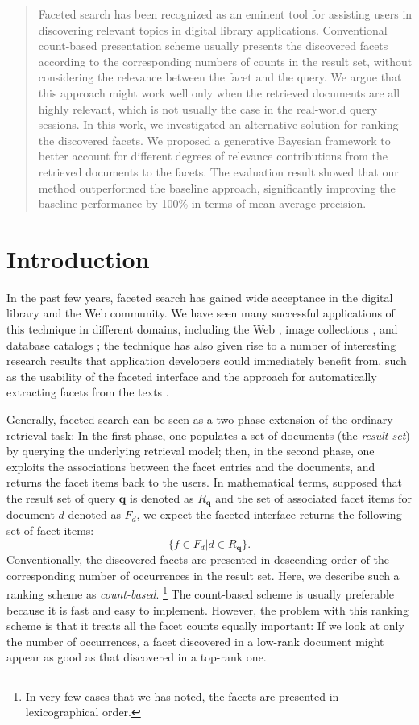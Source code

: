 \begin{abstract} Faceted search has been recognized as an eminent tool for
assisting users in discovering relevant topics in digital library applications.
Conventional count-based presentation scheme usually presents the discovered
facets according to the corresponding numbers of counts in the result set,
without considering the relevance between the facet and the query.  We argue
that this approach might work well only when the retrieved documents are all
highly relevant, which is not usually the case in the real-world query
sessions.  In this work,  we investigated an alternative solution for ranking
the discovered facets.  We proposed a generative Bayesian framework to better
account for different degrees of relevance contributions from the retrieved
documents to the facets.  The evaluation result showed that our
method outperformed the baseline approach, significantly improving the
baseline performance by 100\% in terms of mean-average precision.
\end{abstract}

\section{Introduction}

In the past few years, faceted search has gained wide acceptance in the digital
library and the Web community.  We have seen many successful applications of
this technique in different domains, including the Web
\cite{hearst2002finding}, image collections \cite{yee2003faceted}, and database
catalogs \cite{roy2008minimum}; the technique has also given rise to a number
of interesting research results that application developers could immediately
benefit from, such as the usability of the faceted interface
\cite{kules2009what} and the approach for automatically extracting facets from
the texts \cite{mimno2007organizing}.  

Generally, faceted search can be seen as a two-phase extension of the ordinary
retrieval task: In the first phase, one populates a set of documents (the
\emph{result set}) by querying the underlying retrieval model; then, in the
second phase, one exploits the associations between the facet entries and the
documents, and returns the facet items back to the users.  In mathematical
terms, supposed that the result set of query $\mathbf{q}$ is denoted as
$R_{\mathbf{q}}$ and the set of associated facet items for document $d$ denoted
as $F_d$, we expect the faceted interface returns the following set of facet
items: \[ \{ f \in F_d | d \in R_{\mathbf{q}} \}.  \] Conventionally, the
discovered facets are presented in descending order of the corresponding number
of occurrences in the result set.  Here, we describe such a ranking scheme as
\emph{count-based}.  \footnote{In very few cases that we has noted, the facets
are presented in lexicographical order.} The count-based scheme is usually
preferable because it is fast and easy to implement.  However, the problem with
this ranking scheme is that it treats all the facet counts equally important:
If we look at only the number of occurrences, a facet discovered in a low-rank
document might appear as good as that discovered in a top-rank one.  

